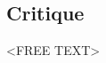 \documentclass{Paper_Summary}
\begin{document}
\makepapertitle

\breakline

\begin{center}
    \section*{Critique}
\end{center}
    <FREE TEXT>

\breakline
\end{document}
